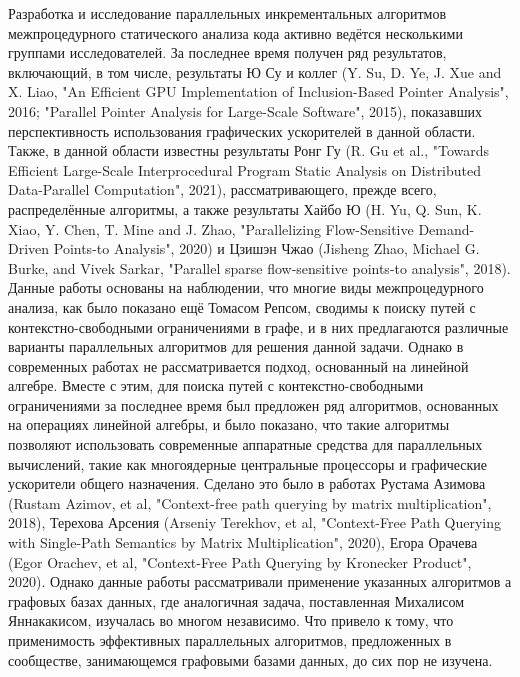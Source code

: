 \documentclass[12pt]{article}  %
\theoremstyle{remark}
\begin{document}
Разработка и исследование параллельных инкрементальных алгоритмов межпроцедурного статического анализа кода активно ведётся несколькими группами исследователей. За последнее время получен ряд результатов, включающий, в том числе, результаты Ю Су и коллег (Y. Su, D. Ye, J. Xue and X. Liao, "An Efficient GPU Implementation of Inclusion-Based Pointer Analysis", 2016; "Parallel Pointer Analysis for Large-Scale Software", 2015), показавших перспективность использования графических ускорителей в данной области. Также, в данной области известны результаты Ронг Гу (R. Gu et al., "Towards Efficient Large-Scale Interprocedural Program Static Analysis on Distributed Data-Parallel Computation", 2021), рассматривающего, прежде всего, распределённые алгоритмы, а также результаты Хайбо Ю (H. Yu, Q. Sun, K. Xiao, Y. Chen, T. Mine and J. Zhao, "Parallelizing Flow-Sensitive Demand-Driven Points-to Analysis", 2020) и  Цзишэн Чжао (Jisheng Zhao, Michael G. Burke, and Vivek Sarkar, "Parallel sparse flow-sensitive points-to analysis", 2018). Данные работы основаны на наблюдении, что многие виды межпроцедурного анализа, как было показано ещё Томасом Репсом, сводимы к поиску путей с контекстно-свободными ограничениями в графе, и в них предлагаются различные варианты параллельных алгоритмов для решения данной задачи. Однако в современных работах не рассматривается подход, основанный на линейной алгебре. Вместе с этим, для поиска путей с контекстно-свободными ограничениями за последнее время был предложен ряд алгоритмов, основанных на операциях линейной алгебры, и было показано, что такие алгоритмы позволяют использовать современные аппаратные средства для параллельных вычислений, такие как многоядерные центральные процессоры и графические ускорители общего назначения. Сделано это было в работах Рустама Азимова (Rustam Azimov, et al, "Context-free path querying by matrix multiplication", 2018), Терехова Арсения (Arseniy Terekhov, et al, "Context-Free Path Querying with Single-Path Semantics by Matrix Multiplication", 2020), Егора Орачева (Egor Orachev, et al, "Context-Free Path Querying by Kronecker Product", 2020). Однако данные работы рассматривали применение указанных алгоритмов а графовых базах данных, где аналогичная задача, поставленная Михалисом Яннакакисом, изучалась во многом независимо. Что привело к тому, что применимость эффективных параллельных алгоритмов, предложенных в сообществе, занимающемся графовыми базами данных, до сих пор не изучена.
\end{document}
